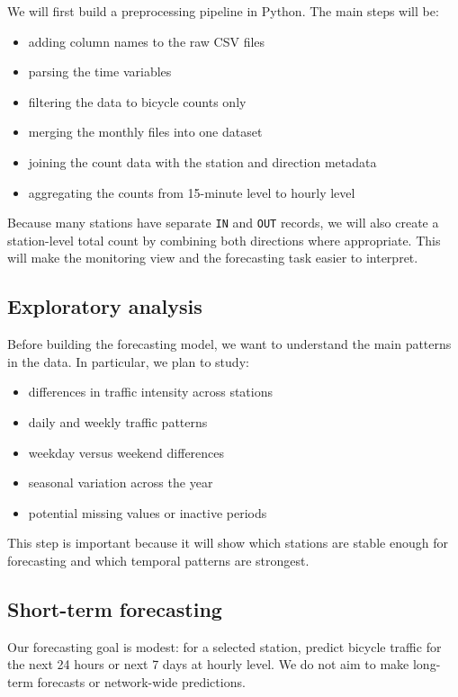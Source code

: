 \documentclass[11pt]{article}
\begin{document}
We will first build a preprocessing pipeline in Python. The main steps will be:

\begin{itemize}
    \item adding column names to the raw CSV files
    \item parsing the time variables
    \item filtering the data to bicycle counts only
    \item merging the monthly files into one dataset
    \item joining the count data with the station and direction metadata
    \item aggregating the counts from 15-minute level to hourly level
\end{itemize}

Because many stations have separate \texttt{IN} and \texttt{OUT} records, we will also create a station-level total count by combining both directions where appropriate. This will make the monitoring view and the forecasting task easier to interpret.

\subsection{Exploratory analysis}

Before building the forecasting model, we want to understand the main patterns in the data. In particular, we plan to study:

\begin{itemize}
    \item differences in traffic intensity across stations
    \item daily and weekly traffic patterns
    \item weekday versus weekend differences
    \item seasonal variation across the year
    \item potential missing values or inactive periods
\end{itemize}

This step is important because it will show which stations are stable enough for forecasting and which temporal patterns are strongest.

\subsection{Short-term forecasting}

Our forecasting goal is modest: for a selected station, predict bicycle traffic for the next 24 hours or next 7 days at hourly level. We do not aim to make long-term forecasts or network-wide predictions.
\end{document}
